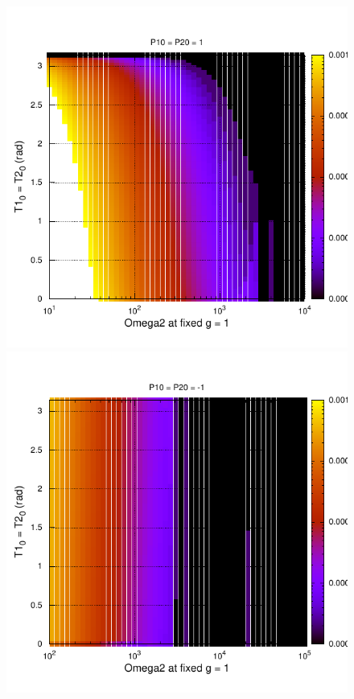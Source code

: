 \documentclass[10pt,letterpaper]{article}
\begin{document}
\begin{figure}
\centering 
\includegraphics[scale=0.8]{P1.pdf}
\includegraphics[scale=0.8]{P-1.pdf}

\end{figure}
\end{document}
